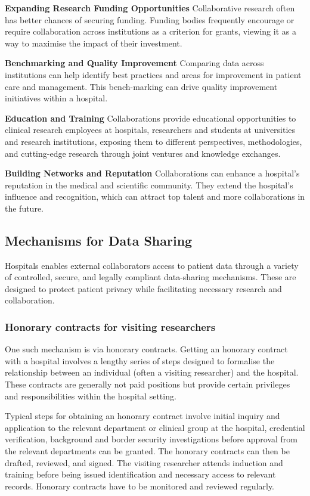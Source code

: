 \documentclass[11pt]{article}
\begin{document}
\textbf{Expanding Research Funding Opportunities} Collaborative research often has better chances of securing funding. Funding bodies frequently encourage or require collaboration across institutions as a criterion for grants, viewing it as a way to maximise the impact of their investment.

\textbf{Benchmarking and Quality Improvement} Comparing data across institutions can help identify best practices and areas for improvement in patient care and management. This bench-marking can drive quality improvement initiatives within a hospital.

\textbf{Education and Training} Collaborations provide educational opportunities to clinical research employees at hospitals, researchers and students at universities and research institutions, exposing them to different perspectives, methodologies, and cutting-edge research through joint ventures and knowledge exchanges.

\textbf{Building Networks and Reputation} Collaborations can enhance a hospital’s reputation in the medical and scientific community. They extend the hospital’s influence and recognition, which can attract top talent and more collaborations in the future.

\subsection{Mechanisms for Data Sharing}

Hospitals enables external collaborators access to patient data through a variety of controlled, secure, and legally compliant data-sharing mechanisms. These are designed to protect patient privacy while facilitating necessary research and collaboration. 

\subsubsection{Honorary contracts for visiting researchers}

One such mechanism is via honorary contracts. Getting an honorary contract with a hospital involves a lengthy series of steps designed to formalise the relationship between an individual (often a visiting researcher) and the hospital. These contracts are generally not paid positions but provide certain privileges and responsibilities within the hospital setting. 

Typical steps for obtaining an honorary contract involve initial inquiry and application to the relevant department or clinical group at the hospital, credential verification, background and border security investigations before approval from the relevant departments can be granted. The honorary contracts can then be drafted, reviewed, and signed. The visiting researcher attends induction and training before being issued identification and necessary access to relevant records. Honorary contracts have to be monitored and reviewed regularly. 
\end{document}
